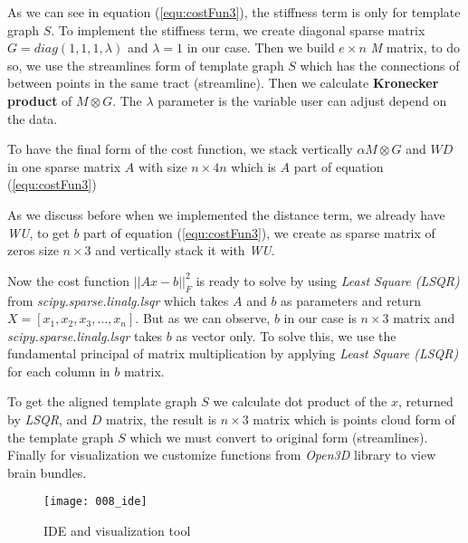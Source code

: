 \documentclass[../structure.tex]{subfiles}
\begin{document}
As we can see in equation (\ref{equ:costFun3}), the stiffness term is only for template graph $S$. To implement the stiffness term, we create diagonal sparse matrix $G = diag(1,1,1,\lambda)$ and $\lambda=1$ in our case. Then we build $e\times n$ \textit{M} matrix, to do so, we use the streamlines form of template graph $S$ which has the connections of between points in the same tract (streamline). Then we calculate \textbf{Kronecker product} of $M \otimes G$. The $\lambda$ parameter is the variable user can adjust depend on the data.

To have the final form of the cost function, we stack vertically $\alpha M \otimes G$ and $WD$ in one sparse matrix $A$ with size $n\times 4n$ which is $A$ part of equation (\ref{equ:costFun3})

As we discuss before when we implemented the distance term, we already have \textit{WU}, to get $b$ part of equation (\ref{equ:costFun3}), we create as sparse matrix of zeros size $n\times 3$ and vertically stack it with \textit{WU}.

Now the cost function $||Ax-b||_{F}^2$ is ready to solve by using \textit{Least Square (LSQR)} from \textit{scipy.sparse.linalg.lsqr} which takes $A$ and $b$ as parameters and return $X=[x_{1}, x_{2}, x_{3}, \dots, x_{n}]$. But as we can observe, $b$ in our case is $n\times 3$ matrix and \textit{scipy.sparse.linalg.lsqr} takes $b$ as vector only. To solve this, we use the fundamental principal of matrix multiplication by applying \textit{Least Square (LSQR)} for each column in $b$ matrix.

To get the aligned template graph $S$ we calculate dot product of the $x$, returned by \textit{LSQR}, and $D$ matrix, the result is $n\times 3$ matrix which is points cloud form of the template graph $S$ which we must convert to original form (streamlines).\\

Finally for visualization we customize functions from \textit{Open3D} library to view brain bundles.

\begin{figure}[h!]
\centering
\texttt{[image: 008\_ide]}
\captionsetup{justification=centering}
\caption{IDE and visualization tool}
\end{figure}
\end{document}
